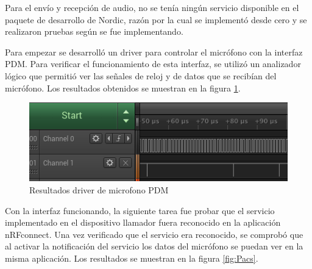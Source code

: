 Para el envío y recepción de audio, no se tenía ningún servicio disponible en el paquete de desarrollo de Nordic, razón por la cual se implementó desde cero y se realizaron pruebas según se fue implementando. 

Para empezar se desarrolló un driver para controlar el micrófono con la interfaz PDM. Para verificar el funcionamiento de esta interfaz, se utilizó un analizador lógico que permitió ver las señales de reloj y de datos que se recibían del micrófono. Los resultados obtenidos se muestran en la figura \ref{fig:Ppdm}.

\begin{figure}[htpb]
	\centering
	\includegraphics[scale=0.8]{./Figures/pdm.png}	
	\caption{Resultados driver de microfono PDM}
	\label{fig:Ppdm}
\end{figure}

Con la interfaz funcionando, la siguiente tarea fue probar que el servicio implementado en el dispositivo llamador fuera reconocido en la aplicación nRFconnect. Una vez verificado que  el servicio era reconocido, se comprobó que al activar la notificación del servicio los datos del micrófono se puedan ver en la misma aplicación. Los resultados se muestran en la figura \ref{fig:Pacs}.

